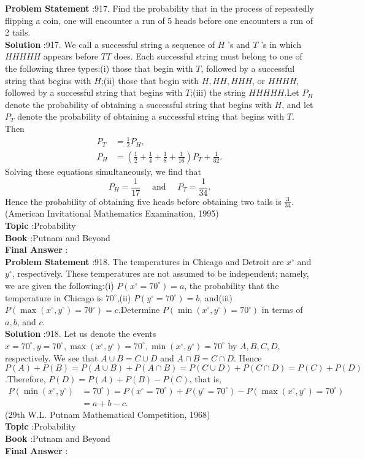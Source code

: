 \documentclass[10pt]{article}
\begin{document}
\textbf{Problem Statement} :917. Find the probability that in the process of repeatedly flipping a coin, one will encounter a run of 5 heads before one encounters a run of 2 tails.\\
\textbf{Solution} :917. We call a successful string a sequence of $H$ 's and $T$ 's in which $H H H H H$ appears before $T T$ does. Each successful string must belong to one of the following three types:(i) those that begin with $T$, followed by a successful string that begins with $H$;(ii) those that begin with $H, H H, H H H$, or $H H H H$, followed by a successful string that begins with $T$;(iii) the string $H H H H H$.Let $P_{H}$ denote the probability of obtaining a successful string that begins with $H$, and let $P_{T}$ denote the probability of obtaining a successful string that begins with $T$. Then$$ \begin{aligned} P_{T} &=\frac{1}{2} P_{H}, \\ P_{H} &=\left(\frac{1}{2}+\frac{1}{4}+\frac{1}{8}+\frac{1}{16}\right) P_{T}+\frac{1}{32} . \end{aligned} $$Solving these equations simultaneously, we find that$$ P_{H}=\frac{1}{17} \quad \text { and } \quad P_{T}=\frac{1}{34} . $$Hence the probability of obtaining five heads before obtaining two tails is $\frac{3}{34}$.(American Invitational Mathematics Examination, 1995)\\
\textbf{Topic} :Probability\\
\textbf{Book} :Putnam and Beyond\\
\textbf{Final Answer} :\\


\textbf{Problem Statement} :918. The temperatures in Chicago and Detroit are $x^{\circ}$ and $y^{\circ}$, respectively. These temperatures are not assumed to be independent; namely, we are given the following:(i) $P\left(x^{\circ}=70^{\circ}\right)=a$, the probability that the temperature in Chicago is $70^{\circ}$,(ii) $P\left(y^{\circ}=70^{\circ}\right)=b$, and(iii) $P\left(\max \left(x^{\circ}, y^{\circ}\right)=70^{\circ}\right)=c$.Determine $P\left(\min \left(x^{\circ}, y^{\circ}\right)=70^{\circ}\right)$ in terms of $a, b$, and $c$.\\
\textbf{Solution} :918. Let us denote the events $x=70^{\circ}, y=70^{\circ}, \max \left(x^{\circ}, y^{\circ}\right)=70^{\circ}, \min \left(x^{\circ}, y^{\circ}\right)=70^{\circ}$ by $A, B, C, D$, respectively. We see that $A \cup B=C \cup D$ and $A \cap B=C \cap D$. Hence$P(A)+P(B)=P(A \cup B)+P(A \cap B)=P(C \cup D)+P(C \cap D)=P(C)+P(D)$.Therefore, $P(D)=P(A)+P(B)-P(C)$, that is, $$ \begin{aligned} P\left(\min \left(x^{\circ}, y^{\circ}\right)\right.&\left.=70^{\circ}\right)=P\left(x^{\circ}=70^{\circ}\right)+P\left(y^{\circ}=70^{\circ}\right)-P\left(\max \left(x^{\circ}, y^{\circ}\right)=70^{\circ}\right) \\ &=a+b-c . \end{aligned} $$(29th W.L. Putnam Mathematical Competition, 1968)\\
\textbf{Topic} :Probability\\
\textbf{Book} :Putnam and Beyond\\
\textbf{Final Answer} :\\
\end{document}
